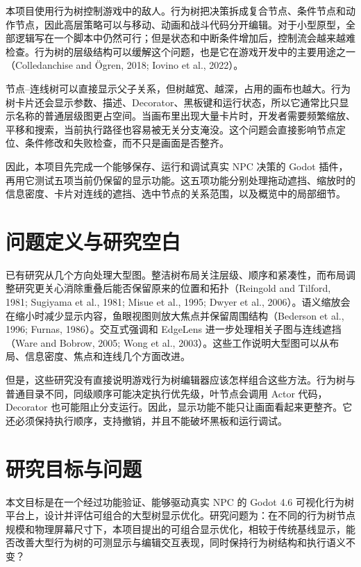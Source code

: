 \documentclass[11pt,a4paper,oneside,extrafontsizes]{memoir}
\begin{document}
本项目使用行为树控制游戏中的敌人。行为树把决策拆成复合节点、条件节点和动作节点，因此高层策略可以与移动、动画和战斗代码分开编辑。对于小型原型，全部逻辑写在一个脚本中仍然可行；但是状态和中断条件增加后，控制流会越来越难检查。行为树的层级结构可以缓解这个问题，也是它在游戏开发中的主要用途之一（Colledanchise and Ögren, 2018; Iovino et al., 2022）。

节点–连线树可以直接显示父子关系，但树越宽、越深，占用的画布也越大。行为树卡片还会显示参数、描述、Decorator、黑板键和运行状态，所以它通常比只显示名称的普通层级图更占空间。当画布里出现大量卡片时，开发者需要频繁缩放、平移和搜索，当前执行路径也容易被无关分支淹没。这个问题会直接影响节点定位、条件修改和失败检查，而不只是画面是否整齐。

因此，本项目先完成一个能够保存、运行和调试真实 NPC 决策的 Godot 插件，再用它测试五项当前仍保留的显示功能。这五项功能分别处理拖动遮挡、缩放时的信息密度、卡片对连线的遮挡、选中节点的关系范围，以及概览中的局部细节。

\section{问题定义与研究空白}

已有研究从几个方向处理大型图。整洁树布局关注层级、顺序和紧凑性，而布局调整研究更关心消除重叠后能否保留原来的位置和拓扑（Reingold and Tilford, 1981; Sugiyama et al., 1981; Misue et al., 1995; Dwyer et al., 2006）。语义缩放会在缩小时减少显示内容，鱼眼视图则放大焦点并保留周围结构（Bederson et al., 1996; Furnas, 1986）。交互式强调和 EdgeLens 进一步处理相关子图与连线遮挡（Ware and Bobrow, 2005; Wong et al., 2003）。这些工作说明大型图可以从布局、信息密度、焦点和连线几个方面改进。

但是，这些研究没有直接说明游戏行为树编辑器应该怎样组合这些方法。行为树与普通目录不同，同级顺序可能决定执行优先级，叶节点会调用 Actor 代码，Decorator 也可能阻止分支运行。因此，显示功能不能只让画面看起来更整齐。它还必须保持执行顺序，支持撤销，并且不能破坏黑板和运行调试。

\section{研究目标与问题}

本文目标是在一个经过功能验证、能够驱动真实 NPC 的 Godot 4.6 可视化行为树平台上，设计并评估可组合的大型树显示优化。研究问题为：在不同的行为树节点规模和物理屏幕尺寸下，本项目提出的可组合显示优化，相较于传统基线显示，能否改善大型行为树的可测显示与编辑交互表现，同时保持行为树结构和执行语义不变？
\end{document}
